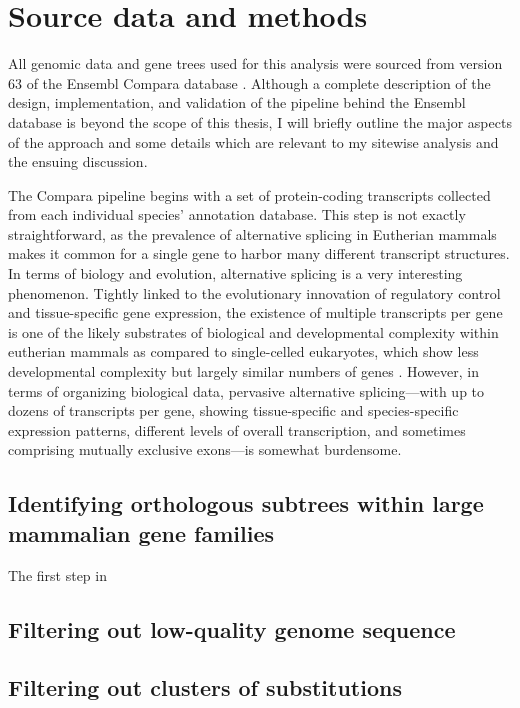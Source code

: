 \section{Source data and methods}

All genomic data and gene trees used for this analysis were sourced
from version 63 of the Ensembl Compara database \citep{TODO, Ensembl
  2010 and EnsemblCompara GeneTrees}. Although a complete description
of the design, implementation, and validation of the pipeline behind
the Ensembl database is beyond the scope of this thesis, I will
briefly outline the major aspects of the approach and some details
which are relevant to my sitewise analysis and the ensuing discussion.

The Compara pipeline begins with a set of protein-coding transcripts
collected from each individual species' annotation database. This step
is not exactly straightforward, as the prevalence of alternative
splicing in Eutherian mammals makes it common for a single gene to
harbor many different transcript structures. In terms of biology and
evolution, alternative splicing is a very interesting
phenomenon. Tightly linked to the evolutionary innovation of
regulatory control and tissue-specific gene expression, the existence
of multiple transcripts per gene is one of the likely substrates of
biological and developmental complexity within eutherian mammals as
compared to single-celled eukaryotes, which show less developmental
complexity but largely similar numbers of genes \citep{TODO}. However,
in terms of organizing biological data, pervasive alternative
splicing---with up to dozens of transcripts per gene, showing
tissue-specific and species-specific expression patterns, different
levels of overall transcription, and sometimes comprising mutually
exclusive exons---is somewhat burdensome. 

\subsection{Identifying orthologous subtrees within large mammalian gene families}

The first step in 

\subsection{Filtering out low-quality genome sequence}




\subsection{Filtering out clusters of \nsyn substitutions}


